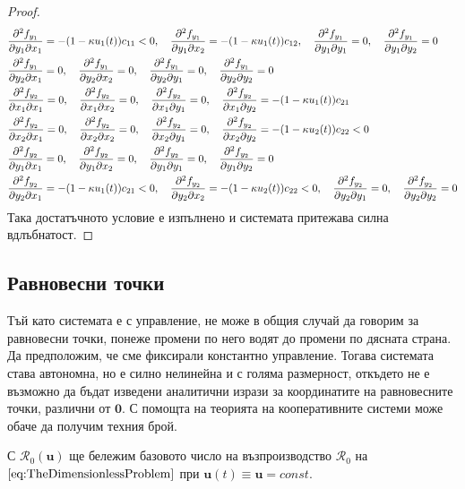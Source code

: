\begin{proof}
{\begin{align*}
    &\pdv{f_{y_1}}{y_1}{x_1} = -(1-\kappa u_1(t))c_{11} < 0, \quad
    \pdv{f_{y_1}}{y_1}{x_2} = -(1-\kappa u_1(t))c_{12}, \quad
    \pdv{f_{y_1}}{y_1}{y_1} = 0, \quad
    \pdv{f_{y_1}}{y_1}{y_2} = 0 \\
    &\pdv{f_{y_1}}{y_2}{x_1} = 0, \quad
    \pdv{f_{y_1}}{y_2}{x_2} = 0, \quad
    \pdv{f_{y_1}}{y_2}{y_1} = 0, \quad
    \pdv{f_{y_1}}{y_2}{y_2} = 0 \\
    &\pdv{f_{y_2}}{x_1}{x_1} = 0, \quad
    \pdv{f_{y_2}}{x_1}{x_2} = 0, \quad
    \pdv{f_{y_2}}{x_1}{y_1} = 0, \quad
    \pdv{f_{y_2}}{x_1}{y_2} = -(1-\kappa u_1(t)) c_{21} \\
    &\pdv{f_{y_2}}{x_2}{x_1} = 0, \quad
    \pdv{f_{y_2}}{x_2}{x_2} = 0, \quad
    \pdv{f_{y_2}}{x_2}{y_1} = 0, \quad
    \pdv{f_{y_2}}{x_2}{y_2} = -(1-\kappa u_2(t)) c_{22} < 0 \\
    &\pdv{f_{y_2}}{y_1}{x_1} = 0, \quad
    \pdv{f_{y_2}}{y_1}{x_2} = 0, \quad
    \pdv{f_{y_2}}{y_1}{y_1} = 0, \quad
    \pdv{f_{y_2}}{y_1}{y_2} = 0 \\
    &\pdv{f_{y_2}}{y_2}{x_1} = -(1-\kappa u_1(t)) c_{21} < 0, \quad
    \pdv{f_{y_2}}{y_2}{x_2} = -(1-\kappa u_2(t)) c_{22} < 0, \quad
    \pdv{f_{y_2}}{y_2}{y_1} = 0, \quad
    \pdv{f_{y_2}}{y_2}{y_2} = 0
  \end{align*}
}
Така достатъчното условие е изпълнено и системата притежава силна вдлъбнатост.
\end{proof}


\subsection{Равновесни точки}

Тъй като системата е с управление, не може в общия случай да говорим за равновесни точки, понеже промени по него водят до промени по дясната страна.
Да предположим, че сме фиксирали константно управление.
Тогава системата става автономна, но е силно нелинейна и с голяма размерност, откъдето не е възможно да бъдат изведени аналитични изрази за координатите на равновесните точки, различни от $\mathbf{0}$.
С помощта на теорията на кооперативните системи може обаче да получим техния брой.

\begin{definition}
  С $\mathscr{R}_0(\mathbf{u})$ ще бележим базовото число на възпроизводство $\mathscr{R}_0$ на $\eqref{eq:TheDimensionlessProblem}$ при $\mathbf{u}(t)\equiv \mathbf{u}=const$.
\end{definition}

